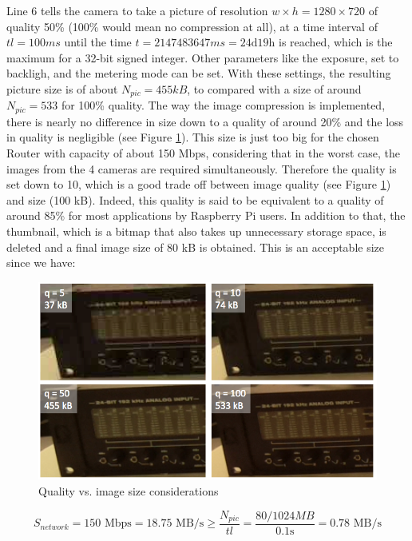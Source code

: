 Line 6 tells the camera to take a picture of resolution $w \times h = 1280 \times 720$ of quality 50\% (100\% would mean no compression at all), at a time interval of $tl = 100ms$ until the time $t = 2147483647ms = 24 \text{d} 19 \text{h}$ is reached, which is the maximum for a 32-bit signed integer.
Other parameters like the exposure, set to backligh, and the metering mode can be set. 
With these settings, the resulting picture size is of about $N_{pic}=455kB$, to compared with a size of around $N_{pic}=533$ for 100\% quality. The way the image compression is implemented, there is nearly no difference in size down to a quality of around 20\% and the loss in quality is negligible (see Figure \ref{fig:quality}).
This size is just too big for the chosen Router with capacity of about 150 Mbps, considering that in the worst case, the images from the 4 cameras are required simultaneously. Therefore the quality is set down to 10, which is a good trade off between image quality (see Figure \ref{fig:quality}) and size (100 kB). Indeed, this quality is said to be equivalent to a quality of around 85\% for most applications by Raspberry Pi users. %
In addition to that, the thumbnail, which is a bitmap that also takes up unnecessary storage space, is deleted and a final image size of 80 kB is obtained. This is an acceptable size since we have:

\begin{figure}[htb]
    \centering
    \includegraphics[width=.8\linewidth]{files/quality.png}
    \caption{Quality vs. image size considerations}
    \label{fig:quality}
\end{figure}

\begin{equation}
    S_{network} = 150 \text{ Mbps} = 18.75 \text{ MB/s} \geq \frac{N_{pic}}{tl}  = \frac{80/1024 MB}{0.1\text{s}}= 0.78 \text{ MB/s}
\end{equation}

